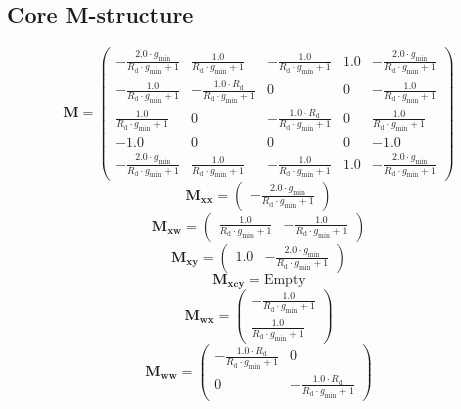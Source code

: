 \documentclass[11pt, oneside]{article}      %
\begin{document}
\subsection{Core M-structure}
%
$$ \mathbf{M} = \left(\begin{array}{ccccc}- \frac{2.0 \cdot g_{\mathrm{min}}}{R_{\mathrm{d}} \cdot g_{\mathrm{min}} + 1} & \frac{1.0}{R_{\mathrm{d}} \cdot g_{\mathrm{min}} + 1} & - \frac{1.0}{R_{\mathrm{d}} \cdot g_{\mathrm{min}} + 1} & 1.0 & - \frac{2.0 \cdot g_{\mathrm{min}}}{R_{\mathrm{d}} \cdot g_{\mathrm{min}} + 1}\\- \frac{1.0}{R_{\mathrm{d}} \cdot g_{\mathrm{min}} + 1} & - \frac{1.0 \cdot R_{\mathrm{d}}}{R_{\mathrm{d}} \cdot g_{\mathrm{min}} + 1} & 0 & 0 & - \frac{1.0}{R_{\mathrm{d}} \cdot g_{\mathrm{min}} + 1}\\\frac{1.0}{R_{\mathrm{d}} \cdot g_{\mathrm{min}} + 1} & 0 & - \frac{1.0 \cdot R_{\mathrm{d}}}{R_{\mathrm{d}} \cdot g_{\mathrm{min}} + 1} & 0 & \frac{1.0}{R_{\mathrm{d}} \cdot g_{\mathrm{min}} + 1}\\-1.0 & 0 & 0 & 0 & -1.0\\- \frac{2.0 \cdot g_{\mathrm{min}}}{R_{\mathrm{d}} \cdot g_{\mathrm{min}} + 1} & \frac{1.0}{R_{\mathrm{d}} \cdot g_{\mathrm{min}} + 1} & - \frac{1.0}{R_{\mathrm{d}} \cdot g_{\mathrm{min}} + 1} & 1.0 & - \frac{2.0 \cdot g_{\mathrm{min}}}{R_{\mathrm{d}} \cdot g_{\mathrm{min}} + 1}\end{array}\right)$$
%
$$ \mathbf{M_{xx}} = \left(\begin{array}{c}- \frac{2.0 \cdot g_{\mathrm{min}}}{R_{\mathrm{d}} \cdot g_{\mathrm{min}} + 1}\end{array}\right)$$
%
$$ \mathbf{M_{xw}} = \left(\begin{array}{cc}\frac{1.0}{R_{\mathrm{d}} \cdot g_{\mathrm{min}} + 1} & - \frac{1.0}{R_{\mathrm{d}} \cdot g_{\mathrm{min}} + 1}\end{array}\right)$$
%
$$ \mathbf{M_{xy}} = \left(\begin{array}{cc}1.0 & - \frac{2.0 \cdot g_{\mathrm{min}}}{R_{\mathrm{d}} \cdot g_{\mathrm{min}} + 1}\end{array}\right)$$
%
$$ \mathbf{M_{xcy}} = \mathrm{Empty}$$
%
$$ \mathbf{M_{wx}} = \left(\begin{array}{c}- \frac{1.0}{R_{\mathrm{d}} \cdot g_{\mathrm{min}} + 1}\\\frac{1.0}{R_{\mathrm{d}} \cdot g_{\mathrm{min}} + 1}\end{array}\right)$$
%
$$ \mathbf{M_{ww}} = \left(\begin{array}{cc}- \frac{1.0 \cdot R_{\mathrm{d}}}{R_{\mathrm{d}} \cdot g_{\mathrm{min}} + 1} & 0\\0 & - \frac{1.0 \cdot R_{\mathrm{d}}}{R_{\mathrm{d}} \cdot g_{\mathrm{min}} + 1}\end{array}\right)$$
\end{document}
